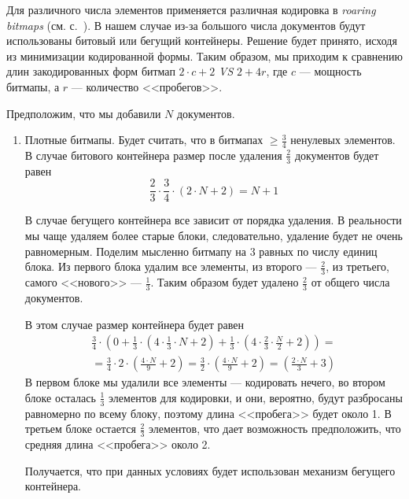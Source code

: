 Для различного числа элементов применяется различная кодировка в
\textit{roaring bitmaps} (см. с.~\pageref{bitmap}). В нашем случае из-за большого
числа документов будут использованы битовый или бегущий контейнеры. Решение будет
принято, исходя из минимизации кодированной формы. Таким образом, мы приходим к
сравнению длин закодированных форм битмап $2\cdot c + 2$ \textit{VS} $2 + 4r$,
где $c$ — мощность битмапы, а $r$ — количество <<пробегов>>.

Предположим, что мы добавили $N$ документов.
\begin{enumerate}
    \item Плотные битмапы. Будет считать, что в битмапах $\geq \frac{3}{4}$
    ненулевых элементов. В случае битового контейнера размер после удаления
    $\frac{2}{3}$ документов будет равен
    \begin{equation}
        \frac{2}{3} \cdot \frac{3}{4} \cdot \left(2\cdot N + 2\right) = N + 1
    \end{equation}
    
    В случае бегущего контейнера все зависит от порядка удаления. В реальности
    мы чаще удаляем более старые блоки, следовательно, удаление будет не очень
    равномерным. Поделим мысленно битмапу на 3 равных по числу единиц блока.
    Из первого блока удалим все элементы, из второго — $\frac{2}{3}$, из
    третьего, самого <<нового>> — $\frac{1}{3}$. Таким образом будет удалено
    $\frac{2}{3}$ от общего числа документов.

    В этом случае размер контейнера будет равен
    \begin{multline}
        \frac{3}{4} \cdot \left(0 +
            \frac{1}{3} \cdot \left(4 \cdot \frac{1}{3} \cdot N + 2\right) +
            \frac{1}{3} \cdot \left(4 \cdot \frac{2}{3} \cdot \frac{N}{2} + 2\right)
            \right) =\\
            = \frac{3}{4} \cdot 2 \cdot \left(\frac{4 \cdot N}{9} + 2\right)
            = \frac{3}{2} \cdot \left(\frac{4 \cdot N}{9} + 2\right)
            = \left(\frac{2 \cdot N}{3} + 3\right)
    \end{multline}
    В первом блоке мы удалили все элементы — кодировать нечего, во втором блоке
    осталась $\frac{1}{3}$ элементов для кодировки, и они, вероятно, будут
    разбросаны равномерно по всему блоку, поэтому длина <<пробега>> будет около 1.
    В третьем блоке остается $\frac{2}{3}$ элементов, что дает возможность
    предположить, что средняя длина <<пробега>> около 2.

    Получается, что при данных условиях будет использован механизм бегущего контейнера.


\end{enumerate}
